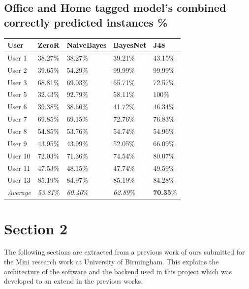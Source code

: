 \documentclass[prodmode,acmtecs]{acmsmall}
\begin{document}
\subsection{Office and Home tagged model's combined correctly predicted instances \%}
\label{APX:individual-Combined}
\begin{table}[htdp]
\begin{tabular}{lllll}
\hline
\textbf{User}      &\textbf{ZeroR}      & \textbf{NaiveBayes}      & \textbf{BayesNet}     & \textbf{J48}      \\ \hline
User 1  & 38.27\% & 38.27\% & 39.21\% & 43.15\% \\
User 2  & 39.65\% & 54.29\% & 99.99\% & 99.99\% \\
User 3  & 68.81\% & 69.03\% & 65.71\% & 72.57\% \\
User 5  & 32.43\% & 92.79\% & 58.11\% & 100\%   \\
User 6  & 39.38\% & 38.66\% & 41.72\% & 46.34\% \\
User 7  & 69.85\% & 69.15\% & 72.76\% & 76.83\% \\
User 8  & 54.85\% & 53.76\% & 54.74\% & 54.96\% \\
User 9  & 43.95\% & 43.99\% & 52.05\% & 66.09\% \\
User 10 & 72.03\% & 71.36\% & 74.54\% & 80.07\% \\
User 11 & 47.53\% & 48.15\% & 47.74\% & 49.59\% \\
User 13 & 85.19\% & 84.97\% & 85.19\% & 84.28\% \\ \hline 
\textit{Average} & \textit{53.81}\% & \textit{60.40}\% & \textit{62.89}\% & \textbf{70.35}\% \\\hline
\end{tabular}
\end{table}

\newpage
\section{Section 2}
\label{APX:previousWork}
The following sections are extracted from a previous work of ours submitted for the Mini research work at University of Birmingham. This explains the architecture of the software and the backend used in this project which was developed to an extend in the previous works.
\pagestyle{plain}

\end{document}
